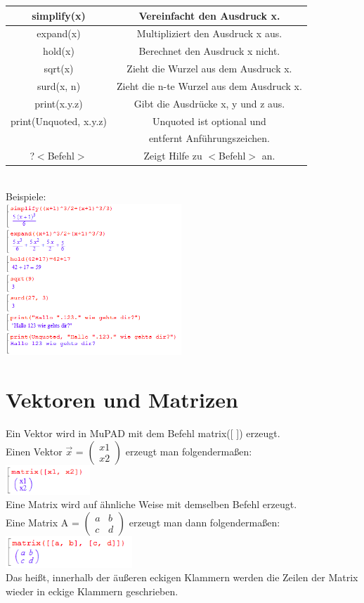 \documentclass[11pt,final]{scrreprt}
\newcommand{\br} {\medskip\\}
\newcommand{\gbr} {\bigskip\\}
\begin{document}
\begin{tabular}{|c|c|}
\hline 
simplify(x) & Vereinfacht den Ausdruck x.\\ 
\hline 
expand(x) & Multipliziert den Ausdruck x aus. \\ 
\hline
hold(x) & Berechnet den Ausdruck x nicht. \\
\hline
sqrt(x) & Zieht die Wurzel aus dem Ausdruck x. \\
\hline
surd(x, n) & Zieht die n-te Wurzel aus dem Ausdruck x.\\
\hline
print(x.y.z) & Gibt die Ausdrücke x, y und z aus.\\
print(Unquoted, x.y.z) & Unquoted ist optional und \\ &entfernt Anführungszeichen.\\
\hline
?$<$Befehl$>$ & Zeigt Hilfe zu $<$Befehl$>$ an.\\
\hline 
\end{tabular} 
\gbr
Beispiele:\br
\includegraphics[width = 250px]{images/grundfunktionen_1}

\section{Vektoren und Matrizen}

Ein Vektor wird in MuPAD mit dem Befehl matrix([ ]) erzeugt.\\
Einen Vektor $\overrightarrow{x}$ = $\left(\begin{matrix}
x1\\
x2
\end{matrix}\right)$ erzeugt man folgendermaßen:\\
\includegraphics[width = 120px]{images/matrix_1}\br

Eine Matrix wird auf ähnliche Weise mit demselben Befehl erzeugt.\\
Eine Matrix A = $\left(\begin{matrix}
a & b\\
c & d
\end{matrix}\right)$ erzeugt man dann folgendermaßen:\\
\includegraphics[width = 180px]{images/matrix_2}\br
Das heißt, innerhalb der äußeren eckigen Klammern werden die Zeilen der Matrix wieder in eckige Klammern geschrieben.
\end{document}
